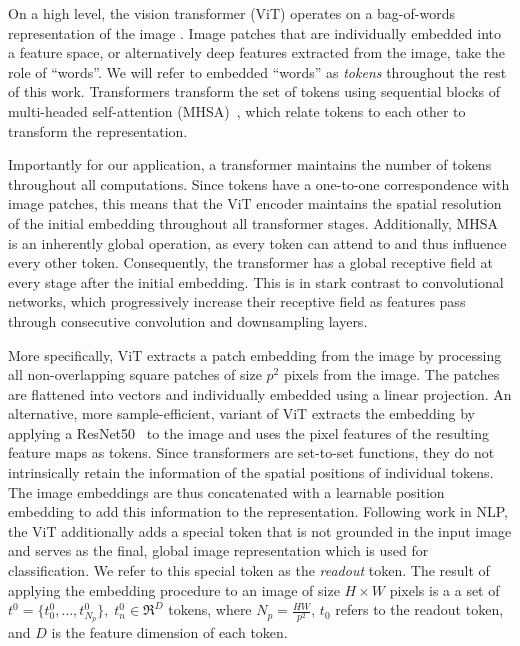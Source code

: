 \documentclass[10pt,twocolumn,letterpaper]{article}
\begin{document}
 On a high level, the vision transformer (ViT)
\cite{Dosovitskiy2020} operates on a bag-of-words representation of the image
\cite{Sivic2009}. Image patches that are individually embedded into a feature
space, or alternatively deep features extracted from the image, take the role of
``words''. We will refer to embedded ``words'' as \emph{tokens} throughout the
rest of this work. Transformers transform the set of tokens using sequential
blocks of multi-headed self-attention (MHSA)~\cite{Vaswani2017}, which relate
tokens to each other to transform the representation.

Importantly for our application, a transformer maintains the number of tokens
throughout all computations. Since tokens have a one-to-one correspondence with
image patches, this means that the ViT encoder maintains the spatial resolution
of the initial embedding throughout all transformer stages. Additionally, MHSA
is an inherently global operation, as every token can attend to and thus
influence every other token. Consequently, the transformer has a global
receptive field at every stage after the initial embedding. This is in stark
contrast to convolutional networks, which progressively increase their receptive
field as features pass through consecutive convolution and downsampling layers.

More specifically, ViT extracts a patch embedding from the image by processing
all non-overlapping square patches of size $p^2$ pixels from the image. The
patches are flattened into vectors and individually embedded using a linear
projection. An alternative, more sample-efficient, variant of ViT extracts the
embedding by applying a ResNet50~\cite{He2016} to the image and uses the pixel
features of the resulting feature maps as tokens. Since transformers are
set-to-set functions, they do not intrinsically retain the information of the
spatial positions of individual tokens. The image embeddings are thus
concatenated with a learnable position embedding to add this information to the
representation. Following work in NLP, the ViT additionally adds a special token
that is not grounded in the input image and serves as the final, global image
representation which is used for classification. We refer to this special token
as the \emph{readout} token. The result of applying the embedding procedure to
an image of size $H \times W$ pixels is a a set of
$t^{0} = \{t^{0}_{0}, \dots, t_{N_{p}}^{0}\},\; t_{n}^{0} \in \Re^{D}$ tokens,
where $N_{p} = \frac{HW}{p^{2}}$, $t_{{0}}$ refers to the readout token, and $D$
is the feature dimension of each token.
\end{document}

